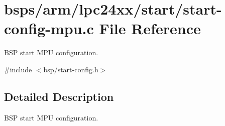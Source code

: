 \hypertarget{start-config-mpu_8c}{}\section{bsps/arm/lpc24xx/start/start-\/config-\/mpu.c File Reference}
\label{start-config-mpu_8c}


B\+SP start M\+PU configuration.  


{\ttfamily \#include $<$bsp/start-\/config.\+h$>$}\newline


\subsection{Detailed Description}
B\+SP start M\+PU configuration. 

